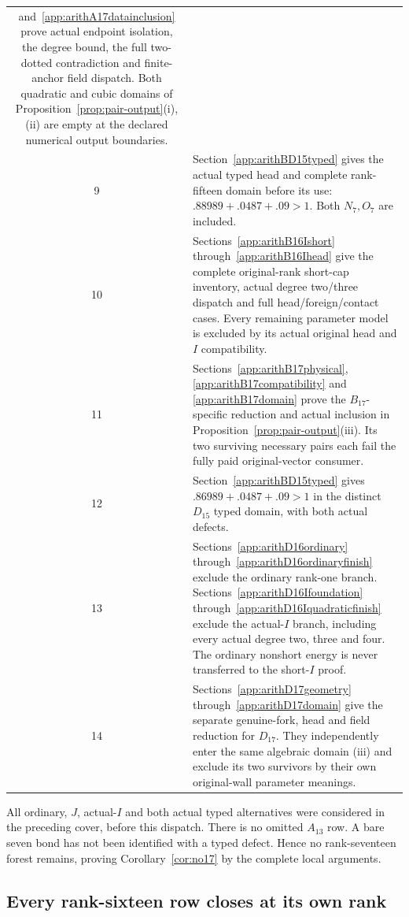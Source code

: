 \begin{longtable}{cp{10.3cm}}
and~\ref{app:arithA17datainclusion}
prove actual endpoint isolation,
the degree bound, the full two-dotted
contradiction and finite-anchor
field dispatch. Both quadratic and
cubic domains of
Proposition~\ref{prop:pair-output}(i),(ii)
are empty at the declared numerical
output boundaries.\\
9&Section~\ref{app:arithBD15typed}
gives the actual typed head and
complete rank-fifteen domain before
its use: \(.88989+.0487+.09>1\).
Both \(N_7,O_7\) are included.\\
10&Sections~\ref{app:arithB16Ishort}
through~\ref{app:arithB16Ihead}
give the complete original-rank
short-cap inventory, actual degree
two/three dispatch and full
head/foreign/contact cases.
Every remaining parameter model
is excluded by its actual original
head and \(I\) compatibility.\\
11&Sections~\ref{app:arithB17physical},
\ref{app:arithB17compatibility} and
\ref{app:arithB17domain} prove the
\(B_{17}\)-specific reduction and
actual inclusion in
Proposition~\ref{prop:pair-output}(iii).
Its two surviving necessary pairs
each fail the fully paid
original-vector consumer.\\
12&Section~\ref{app:arithBD15typed}
gives \(.86989+.0487+.09>1\)
in the distinct \(D_{15}\) typed
domain, with both actual defects.\\
13&Sections~\ref{app:arithD16ordinary}
through~\ref{app:arithD16ordinaryfinish}
exclude the ordinary rank-one branch.
Sections~\ref{app:arithD16Ifoundation}
through~\ref{app:arithD16Iquadraticfinish}
exclude the actual-\(I\) branch,
including every actual degree
two, three and four. The ordinary
nonshort energy is never transferred
to the short-\(I\) proof.\\
14&Sections~\ref{app:arithD17geometry}
through~\ref{app:arithD17domain}
give the separate genuine-fork,
head and field reduction for \(D_{17}\).
They independently enter the same
algebraic domain (iii) and exclude
its two survivors by their own
original-wall parameter meanings.\\
\bottomrule
\end{longtable}

All ordinary, \(J\), actual-\(I\)
and both actual typed alternatives
were considered in the preceding
cover, before this dispatch.
There is no omitted \(A_{13}\) row.
A bare seven bond has not been
identified with a typed defect.
Hence no rank-seventeen forest
remains, proving
Corollary~\ref{cor:no17} by the
complete local arguments.

\subsection{Every rank-sixteen row closes at its own rank}
\label{app:arithranksixteenclosure}

